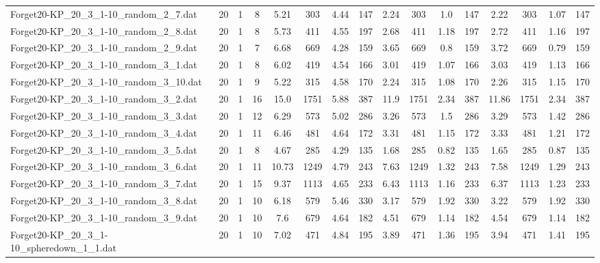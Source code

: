 \begin{sidewaystable}[!ht]
{\begin{tabular}{lccccccccccccccc}
Forget20-KP\_20\_3\_1-10\_random\_2\_7.dat & 20 & 1 & 8 & 5.21 & 303 & 4.44 & 147 & 2.24 & 303 &  \textcolor{blue2}{1.0} & 147 & 2.22 & 303 & 1.07 & 147 \\
Forget20-KP\_20\_3\_1-10\_random\_2\_8.dat & 20 & 1 & 8 & 5.73 & 411 & 4.55 & 197 & 2.68 & 411 & 1.18 & 197 & 2.72 & 411 & 1.16 & 197 \\
Forget20-KP\_20\_3\_1-10\_random\_2\_9.dat & 20 & 1 & 7 & 6.68 & 669 & 4.28 & 159 & 3.65 & 669 & 0.8 & 159 & 3.72 & 669 &  \textcolor{blue2}{0.79} & 159 \\
Forget20-KP\_20\_3\_1-10\_random\_3\_1.dat & 20 & 1 & 8 & 6.02 & 419 & 4.54 & 166 & 3.01 & 419 &  \textcolor{blue2}{1.07} & 166 & 3.03 & 419 & 1.13 & 166 \\
Forget20-KP\_20\_3\_1-10\_random\_3\_10.dat & 20 & 1 & 9 & 5.22 & 315 & 4.58 & 170 & 2.24 & 315 &  \textcolor{blue2}{1.08} & 170 & 2.26 & 315 & 1.15 & 170 \\
Forget20-KP\_20\_3\_1-10\_random\_3\_2.dat & 20 & 1 & 16 & 15.0 & 1751 & 5.88 & 387 & 11.9 & 1751 & 2.34 & 387 & 11.86 & 1751 & 2.34 & 387 \\
Forget20-KP\_20\_3\_1-10\_random\_3\_3.dat & 20 & 1 & 12 & 6.29 & 573 & 5.02 & 286 & 3.26 & 573 & 1.5 & 286 & 3.29 & 573 &  \textcolor{blue2}{1.42} & 286 \\
Forget20-KP\_20\_3\_1-10\_random\_3\_4.dat & 20 & 1 & 11 & 6.46 & 481 & 4.64 & 172 & 3.31 & 481 & 1.15 & 172 & 3.33 & 481 & 1.21 & 172 \\
Forget20-KP\_20\_3\_1-10\_random\_3\_5.dat & 20 & 1 & 8 & 4.67 & 285 & 4.29 & 135 & 1.68 & 285 &  \textcolor{blue2}{0.82} & 135 & 1.65 & 285 & 0.87 & 135 \\
Forget20-KP\_20\_3\_1-10\_random\_3\_6.dat & 20 & 1 & 11 & 10.73 & 1249 & 4.79 & 243 & 7.63 & 1249 & 1.32 & 243 & 7.58 & 1249 & 1.29 & 243 \\
Forget20-KP\_20\_3\_1-10\_random\_3\_7.dat & 20 & 1 & 15 & 9.37 & 1113 & 4.65 & 233 & 6.43 & 1113 & 1.16 & 233 & 6.37 & 1113 & 1.23 & 233 \\
Forget20-KP\_20\_3\_1-10\_random\_3\_8.dat & 20 & 1 & 10 & 6.18 & 579 & 5.46 & 330 & 3.17 & 579 & 1.92 & 330 & 3.22 & 579 & 1.92 & 330 \\
Forget20-KP\_20\_3\_1-10\_random\_3\_9.dat & 20 & 1 & 10 & 7.6 & 679 & 4.64 & 182 & 4.51 & 679 & 1.14 & 182 & 4.54 & 679 & 1.14 & 182 \\
Forget20-KP\_20\_3\_1-10\_spheredown\_1\_1.dat & 20 & 1 & 10 & 7.02 & 471 & 4.84 & 195 & 3.89 & 471 &  \textcolor{blue2}{1.36} & 195 & 3.94 & 471 & 1.41 & 195 \\

\end{tabular}}
\end{sidewaystable}
